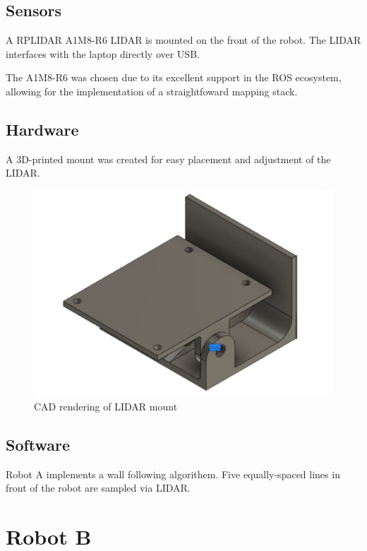 \documentclass[11pt]{article}
\begin{document}
	\subsection{Sensors}
	A RPLIDAR A1M8-R6 LIDAR is mounted on the front of the robot. The LIDAR interfaces with the laptop directly over USB. \newline
	
	The A1M8-R6 was chosen due to its excellent support in the ROS ecosystem, allowing for the implementation of a straightfoward mapping stack. 
	
	\subsection{Hardware}
	A 3D-printed mount was created for easy placement and adjustment of the LIDAR.
	
	\begin{figure}[h]
		\centering
		\includegraphics[scale=0.6]{lidar_mount}
		\caption{CAD rendering of LIDAR mount}
	\end{figure}
	
	\subsection{Software}	
	Robot A implements a wall following algorithem. Five equally-spaced lines in front of the robot are sampled via LIDAR.
	
	\pagebreak

	\section{Robot B}
	
\end{document}

